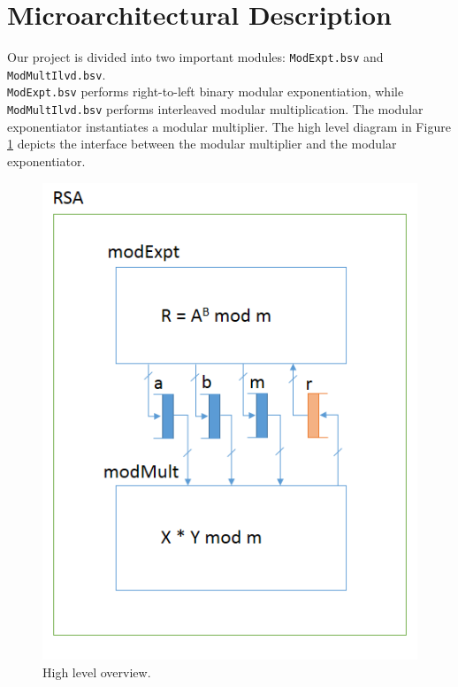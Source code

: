 \documentclass[a4paper,11pt]{report}
\begin{document}
\chapter*{Microarchitectural Description} 

Our project is divided into two important modules: {\tt ModExpt.bsv} and {\tt ModMultIlvd.bsv}.
\\
{\tt ModExpt.bsv} performs right-to-left binary modular exponentiation,
while {\tt ModMultIlvd.bsv} performs interleaved modular multiplication.
The modular exponentiator instantiates a modular multiplier.
The high level diagram in Figure \ref{fig-top} depicts the interface between
the modular multiplier and the modular exponentiator.
\begin{figure}
  \begin{centering}
    \includegraphics[scale=1]{top_level.png}
    \caption{High level overview.}
    \label{fig-top}
  \end{centering}
\end{figure}
\end{document}
